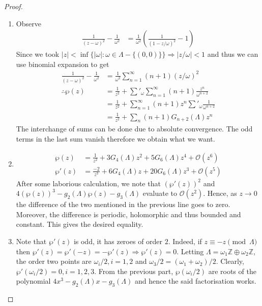 \documentclass[oneside, 12pt]{scrbook}
\newcommand{\ZZ}{\mathbb Z}
\theoremstyle{theorem}
\begin{document}
\begin{proof}
\begin{enumerate}
\item Observe
\begin{align*}
\frac{1}{(z-\omega)^2} - \frac{1}{\omega^2} &= \frac{1}{\omega^2} \left( \frac{1}{(1-z/\omega)^2} -1\right)
\end{align*}
Since we took $|z|< \inf \{|\omega|: \omega \in \Lambda - \{(0,0)\}\} \Rightarrow |z/\omega|<1 $ and thus we can use binomial expansion to get 
\begin{align*}
\frac{1}{(z-\omega)^2} - \frac{1}{\omega^2} &=\frac{1}{\omega^2} \sum_{n=1}^{\infty} (n+1)(z/\omega)^2\\
\therefore \wp(z) &= \frac{1}{z^2} + \sum'_{\omega}\sum_{n=1}^{\infty} (n+1)\frac{z^n}{\omega^{n+2}} \\
&= \frac{1}{z^2} + \sum_{n=1}^{\infty} (n+1)z^n\sum'_{\omega}\frac{1}{\omega^{n+2}}\\
&= \frac{1}{z^2} + \sum_{n} (n+1)G_{n+2}(\Lambda)z^n
\end{align*}
The interchange of sums can be done due to absolute convergence. The odd terms in the last sum vanish therefore we obtain what we want. 
\item \begin{align*}
\wp(z) &= \frac{1}{z^2} + 3G_{4}(\Lambda)z^2 + 5G_{6}(\Lambda)z^4 + \mathcal{O}(z^6) \\
\wp'(z) &= \frac{-2}{z^3} + 6G_{4}(\Lambda)z + 20G_{6}(\Lambda)z^3 + \mathcal{O}(z^5) 
\end{align*}
After some laborious calculation, we note that $(\wp'(z))^2$ and $4(\wp(z))^3 - g_{2}(\Lambda)\wp(z) - g_{3}(\Lambda)$ evaluate to $\mathcal{O}(z^2)$. Hence, as $z\rightarrow 0$ the difference of the two mentioned in the previous line goes to zero. Moreover, the difference is periodic, holomorphic and thus bounded and constant. This gives the desired equality.
\item Note that $\wp'(z)$ is odd, it has zeroes of order $2$. Indeed, if $z \equiv -z \pmod{\Lambda}$ then $\wp'(z) =\wp'(-z) =- \wp'(z)\Rightarrow \wp'(z)=0$. Letting $\Lambda = \omega_{1}\ZZ \oplus \omega_{2}\ZZ$, the order two points are $\omega_{i}/2, i=1,2$ and $\omega_{3}/2 = (\omega_{1}+\omega_{2})/2$. Clearly, $\wp'(\omega_{i}/2)=0, i=1,2,3$. From the previous part, $\wp(\omega_{i}/2)$ are roots of the polynomial $4x^3 -g_{2}(\Lambda)x - g_{3}(\Lambda)$ and hence the said factorisation works. 
\end{enumerate}
\end{proof}
\end{document}
